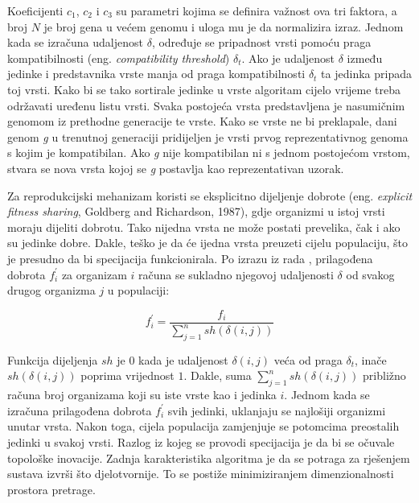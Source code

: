 \documentclass[times, utf8, diplomski, numeric]{fer}
\begin{document}
Koeficijenti $c_1$, $c_2$ i $c_3$ su parametri kojima se definira važnost ova tri faktora, a broj $N$ je broj gena u većem genomu i uloga mu je da normalizira izraz. Jednom kada se izračuna udaljenost $\delta$, određuje se pripadnost vrsti pomoću praga kompatibilnosti (eng. \textit{compatibility threshold}) $\delta_t$. Ako je udaljenost $\delta$ između jedinke i predstavnika vrste manja od praga kompatibilnosti $\delta_t$ ta jedinka pripada toj vrsti. Kako bi se tako sortirale jedinke u vrste algoritam cijelo vrijeme treba održavati uređenu listu vrsti. Svaka postojeća vrsta predstavljena je nasumičnim genomom iz prethodne generacije te vrste. Kako se vrste ne bi preklapale, dani genom \textit{g} u trenutnoj generaciji pridijeljen je vrsti prvog reprezentativnog genoma s kojim je kompatibilan. Ako \textit{g} nije kompatibilan ni s jednom postojećom vrstom, stvara se nova vrsta kojoj se \textit{g} postavlja kao reprezentativan uzorak.

Za reprodukcijski mehanizam koristi se eksplicitno dijeljenje dobrote (eng. \textit{explicit fitness sharing}, Goldberg and Richardson, 1987), gdje organizmi u istoj vrsti moraju dijeliti dobrotu. Tako nijedna vrsta ne može postati prevelika, čak i ako su jedinke dobre. Dakle, teško je da će ijedna vrsta preuzeti cijelu populaciju, što je presudno da bi specijacija funkcionirala. Po izrazu iz rada \citep{rad5}, prilagođena dobrota $f_{i}^{'}$ za organizam $i$ računa se sukladno njegovoj udaljenosti $\delta$ od svakog drugog organizma $j$ u populaciji:

\begin{equation}
f_{i}^{'} = \frac{f_i}{\sum_{j=1}^{n} sh(\delta(i,j))}
\label{jednakost2}
\end{equation}

Funkcija dijeljenja $sh$ je $0$ kada je udaljenost $\delta(i,j)$ veća od praga $\delta_t$, inače $sh(\delta(i,j))$ poprima vrijednost $1$. Dakle, suma $\sum_{j=1}^{n}sh(\delta(i,j))$ približno računa broj organizama koji su iste vrste kao i jedinka $i$. Jednom kada se izračuna prilagođena dobrota $f_{i}^{'}$ svih jedinki, uklanjaju se najlošiji organizmi unutar vrsta. Nakon toga, cijela populacija zamjenjuje se potomcima preostalih jedinki u svakoj vrsti. Razlog iz kojeg se provodi specijacija je da bi se očuvale topološke inovacije. Zadnja karakteristika algoritma je da se potraga za rješenjem sustava izvrši što djelotvornije. To se postiže minimiziranjem dimenzionalnosti prostora pretrage.
\end{document}
